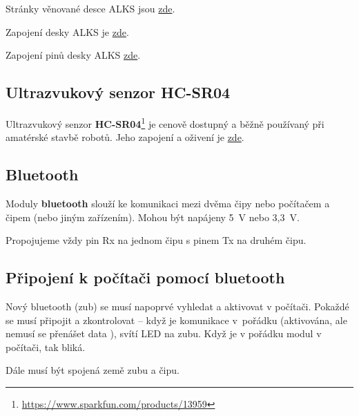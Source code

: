 Stránky  věnované desce ALKS jsou
 \href{https://github.com/RoboticsBrno/ArduinoLearningKitStarter}{zde}.

Zapojení desky ALKS je \href{https://github.com/RoboticsBrno/ArduinoLearningKitStarter/blob/master/docs/ArduinoLearningKitStarter.pdf}{zde}.

Zapojení pinů desky ALKS \href{https://github.com/RoboticsBrno/ArduinoLearningKitStarter/blob/master/docs/pinout.pdf}{zde}. 


\label{hcsr04} \subsection{Ultrazvukový senzor HC-SR04}

Ultrazvukový senzor {\bf HC-SR04}\footnote{\url{https://www.sparkfun.com/products/13959}}  je cenově dostupný a běžně používaný při amatérské stavbě robotů. 
Jeho zapojení a oživení je 
  \href{https://randomnerdtutorials.com/complete-guide-for-ultrasonic-sensor-hc-sr04/}{zde}.





\subsection{Bluetooth}


\hypertarget{bluetooth}{} Moduly {\bf bluetooth} slouží ke komunikaci mezi dvěma čipy nebo počítačem a čipem (nebo jiným zařízením).
Mohou být napájeny 5~V nebo 3,3~V. 

Propojujeme vždy pin Rx na jednom čipu s pinem Tx na druhém čipu. 

\subsection{Připojení k počítači pomocí bluetooth}

Nový bluetooth (zub) se musí napoprvé vyhledat a aktivovat v počítači. 
Pokaždé se musí připojit a zkontrolovat -- když je komunikace v~pořádku (aktivována, ale nemusí se přenášet data ), svítí LED na zubu. 
Když je v pořádku modul v počítači, tak bliká.  

Dále musí být spojená země zubu a čipu.



